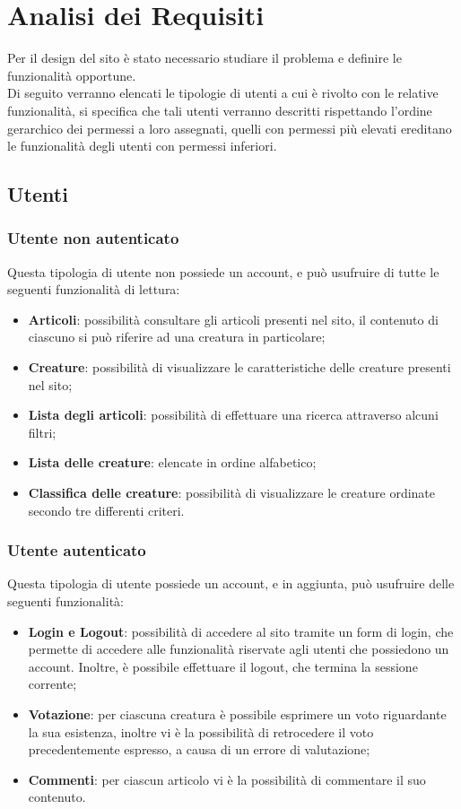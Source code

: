 \section{Analisi dei Requisiti}
\label{sec:analisi-dei-requisiti}

Per il design del sito è stato necessario studiare il problema e definire le funzionalità opportune.\\
Di seguito verranno elencati le tipologie di utenti a cui è rivolto con le relative funzionalità, si specifica che tali utenti verranno descritti rispettando l'ordine gerarchico dei permessi a loro assegnati, quelli con permessi più  elevati ereditano le funzionalità degli utenti con permessi inferiori.

\subsection{Utenti}
\label{subsec:utenti}

\subsubsection{Utente non autenticato}
Questa tipologia di utente non possiede un account, e può usufruire di tutte le seguenti funzionalità di lettura:
\begin{itemize}
    \item \textbf{Articoli}: possibilità consultare gli articoli presenti nel sito, il contenuto di ciascuno si può riferire ad una creatura in particolare;
    \item \textbf{Creature}: possibilità di visualizzare le caratteristiche delle creature presenti nel sito;
    \item \textbf{Lista degli articoli}: possibilità di effettuare una ricerca attraverso alcuni filtri;
    \item \textbf{Lista delle creature}: elencate in ordine alfabetico;
    \item \textbf{Classifica delle creature}: possibilità di visualizzare le creature ordinate secondo tre differenti criteri.
\end{itemize}

\subsubsection{Utente autenticato}
Questa tipologia di utente possiede un account, e in aggiunta, può usufruire delle seguenti funzionalità:
\begin{itemize}
    \item \textbf{Login e Logout}: possibilità di accedere al sito tramite un form di login, che permette di accedere alle funzionalità riservate agli utenti che possiedono un account. Inoltre, è possibile effettuare il logout, che termina la sessione corrente;
    \item \textbf{Votazione}: per ciascuna creatura è possibile esprimere un voto riguardante la sua esistenza, inoltre vi è la possibilità di retrocedere il voto precedentemente espresso, a causa di un errore di valutazione;
    \item \textbf{Commenti}: per ciascun articolo vi è la possibilità di commentare il suo contenuto.
\end{itemize}

